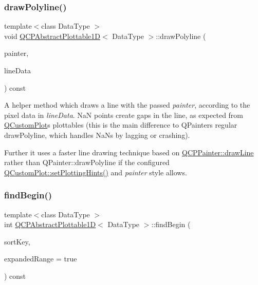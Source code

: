 \subsubsection{\texorpdfstring{draw\+Polyline()}{drawPolyline()}}
{\footnotesize\ttfamily template$<$class Data\+Type $>$ \\
void \hyperlink{class_q_c_p_abstract_plottable1_d}{Q\+C\+P\+Abstract\+Plottable1D}$<$ Data\+Type $>$\+::draw\+Polyline (\begin{DoxyParamCaption}\item[{\hyperlink{class_q_c_p_painter}{Q\+C\+P\+Painter} $\ast$}]{painter,  }\item[{const Q\+Vector$<$ Q\+PointF $>$ \&}]{line\+Data }\end{DoxyParamCaption}) const\hspace{0.3cm}{\ttfamily [protected]}}

A helper method which draws a line with the passed {\itshape painter}, according to the pixel data in {\itshape line\+Data}. NaN points create gaps in the line, as expected from \hyperlink{class_q_custom_plot}{Q\+Custom\+Plot}\textquotesingle{}s plottables (this is the main difference to Q\+Painter\textquotesingle{}s regular draw\+Polyline, which handles Na\+Ns by lagging or crashing).

Further it uses a faster line drawing technique based on \hyperlink{class_q_c_p_painter_a0b4b1b9bd495e182c731774dc800e6e0}{Q\+C\+P\+Painter\+::draw\+Line} rather than {\ttfamily Q\+Painter\+::draw\+Polyline} if the configured \hyperlink{class_q_custom_plot_a94a33cbdadbbac5934843508bcfc210d}{Q\+Custom\+Plot\+::set\+Plotting\+Hints()} and {\itshape painter} style allows. \mbox{\label{class_q_c_p_abstract_plottable1_d_ae6ead74a0d6a17954e1857f361b9ccf2}} 
\subsubsection{\texorpdfstring{find\+Begin()}{findBegin()}}
{\footnotesize\ttfamily template$<$class Data\+Type $>$ \\
int \hyperlink{class_q_c_p_abstract_plottable1_d}{Q\+C\+P\+Abstract\+Plottable1D}$<$ Data\+Type $>$\+::find\+Begin (\begin{DoxyParamCaption}\item[{double}]{sort\+Key,  }\item[{bool}]{expanded\+Range = {\ttfamily true} }\end{DoxyParamCaption}) const\hspace{0.3cm}{\ttfamily [virtual]}}





